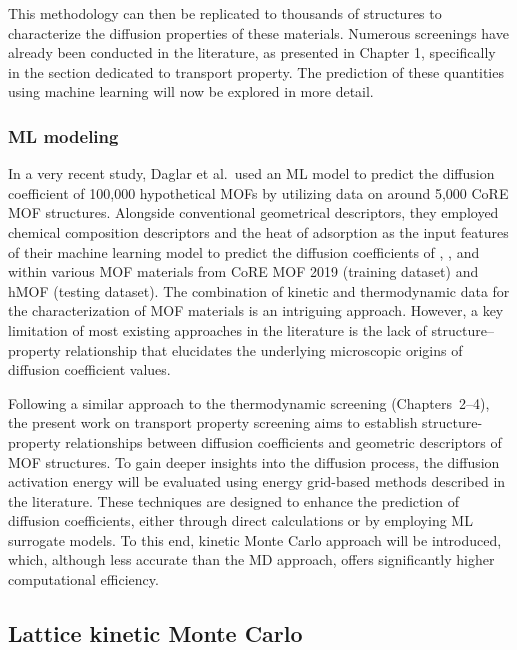 \documentclass[main]{subfiles}
\begin{document}
This methodology can then be replicated to thousands of structures to characterize the diffusion properties of these materials. Numerous screenings have already been conducted in the literature, as presented in Chapter 1, specifically in the section dedicated to transport property. The prediction of these quantities using machine learning will now be explored in more detail.

\subsubsection{ML modeling}

In a very recent study, Daglar et al.\ used an ML model to predict the diffusion coefficient of 100,000 hypothetical MOFs by utilizing data on around 5,000 CoRE MOF structures.\autocite{Daglar_2022} Alongside conventional geometrical descriptors, they employed chemical composition descriptors and the heat of adsorption as the input features of their machine learning model to predict the diffusion coefficients of , ,  and  within various MOF materials from CoRE MOF 2019 (training dataset) and hMOF (testing dataset). The combination of kinetic and thermodynamic data for the characterization of MOF materials is an intriguing approach. However, a key limitation of most existing approaches in the literature is the lack of structure--property relationship that elucidates the underlying microscopic origins of diffusion coefficient values.

Following a similar approach to the thermodynamic screening (Chapters~2--4), the present work on transport property screening aims to establish structure-property relationships between diffusion coefficients and geometric descriptors of MOF structures. To gain deeper insights into the diffusion process, the diffusion activation energy will be evaluated using energy grid-based methods described in the literature. These techniques are designed to enhance the prediction of diffusion coefficients, either through direct calculations or by employing ML surrogate models. To this end, kinetic Monte Carlo approach will be introduced, which, although less accurate than the MD approach, offers significantly higher computational efficiency.

\subsection{Lattice kinetic Monte Carlo}
\end{document}
